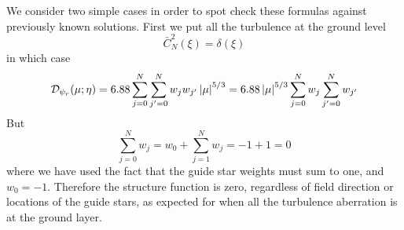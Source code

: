 \documentclass[11pt, oneside]{article}   	%
\begin{document}
We consider two simple cases in order to spot check these formulas against previously known solutions. First we put all the turbulence at the ground level
\begin{equation}
\bar C_N^2(\xi) = \delta(\xi)
\end{equation}
in which case
\begin{equation}
{\cal D}_{\psi_r}(\mu;\eta) = 6.88 \sum_{j=0}^N \sum_{j'=0}^N w_j w_{j'} \left | \mu \right |^{5/3} = 6.88  \left | \mu \right |^{5/3} \sum_{j=0}^N w_j \sum_{j'=0}^N w_{j'}
\end{equation}
But
\begin{equation}
\sum_{j=0}^N w_j = w_0 + \sum_{j=1}^N w_j = -1 + 1 = 0
\end{equation}
where we have used the fact that the guide star weights must sum to one, and $w_0 = -1$. Therefore the structure function is zero, regardless of field direction or locations of the guide stars, as expected for when all the turbulence aberration is at the ground layer.
\end{document}
